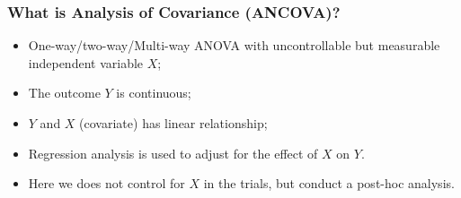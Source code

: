\documentclass[table,10pt]{beamer}\usepackage[]{graphicx}\usepackage[]{color}
\begin{document}
\begin{CJK*}{UTF8}{gbsn}
\begin{frame}[t]
\frametitle{What is Analysis of Covariance (ANCOVA)?}
\begin{itemize}[<+->]
	\item One-way/two-way/Multi-way ANOVA with uncontrollable but measurable 
		independent variable $X$;
	\item The outcome $Y$ is continuous;
	\item $Y$ and $X$ (covariate) has linear relationship;
	\item Regression analysis is used to adjust for the effect of $X$ on $Y$.
	\item Here we does not control for $X$ in the trials, but conduct a post-hoc 
		analysis.
\end{itemize}
\end{frame}



\end{CJK*}
\end{document}
